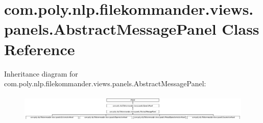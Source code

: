 \hypertarget{classcom_1_1poly_1_1nlp_1_1filekommander_1_1views_1_1panels_1_1_abstract_message_panel}{\section{com.\-poly.\-nlp.\-filekommander.\-views.\-panels.\-Abstract\-Message\-Panel Class Reference}
\label{classcom_1_1poly_1_1nlp_1_1filekommander_1_1views_1_1panels_1_1_abstract_message_panel}
}
Inheritance diagram for com.\-poly.\-nlp.\-filekommander.\-views.\-panels.\-Abstract\-Message\-Panel\-:\begin{figure}[H]
\begin{center}
\leavevmode
\includegraphics[height=1.327014cm]{classcom_1_1poly_1_1nlp_1_1filekommander_1_1views_1_1panels_1_1_abstract_message_panel}
\end{center}
\end{figure}
